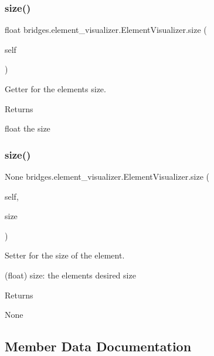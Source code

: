 \subsubsection{\texorpdfstring{size()}{size()}\hspace{0.1cm}{\footnotesize\ttfamily [1/2]}}
{\footnotesize\ttfamily  float bridges.\+element\+\_\+visualizer.\+Element\+Visualizer.\+size (\begin{DoxyParamCaption}\item[{}]{self }\end{DoxyParamCaption})}



Getter for the elements size. 

\begin{DoxyReturn}{Returns}


float the size 
\end{DoxyReturn}
\mbox{\label{classbridges_1_1element__visualizer_1_1_element_visualizer_aa169210ab46d09ede9789910b844dd9e}} 
\subsubsection{\texorpdfstring{size()}{size()}\hspace{0.1cm}{\footnotesize\ttfamily [2/2]}}
{\footnotesize\ttfamily  None bridges.\+element\+\_\+visualizer.\+Element\+Visualizer.\+size (\begin{DoxyParamCaption}\item[{}]{self,  }\item[{}]{size }\end{DoxyParamCaption})}



Setter for the size of the element. 

\begin{DoxyVerb}       (float) size: the elements desired size
\end{DoxyVerb}
 \begin{DoxyReturn}{Returns}


None 
\end{DoxyReturn}


\subsection{Member Data Documentation}
\mbox{\label{classbridges_1_1element__visualizer_1_1_element_visualizer_a1fd985698e1c56289ed49fa7849d43ab}} 
